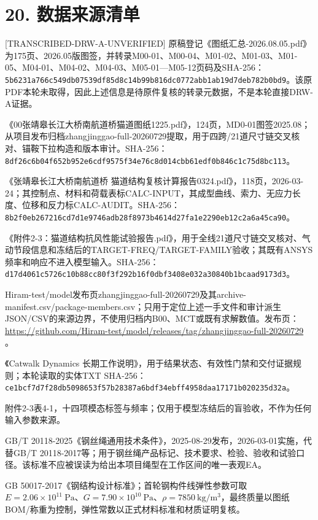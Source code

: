 \documentclass[UTF8,a4paper,11pt,fontset=none]{ctexart}
\begin{document}
\section*{20. 数据来源清单}
[TRANSCRIBED-DRW-A-UNVERIFIED] 原稿登记《图纸汇总-2026.08.05.pdf》为175页、2026.05版图签，并转录M00-01、M00-04、M01-02、M01-03、M01-05、M04-01、M04-02、M04-03、M05-01—M05-12页码及SHA-256：\nolinkurl{5b6231a766c549db07539df85d8c14b99b816dc0772abb1ab19d7deb782b0bd9}。该原PDF本轮未取得，因此上述信息是待原件复核的转录元数据，不是本轮直接DRW-A证据。\par
[DRW-2025-ARCHIVE] 《00张靖皋长江大桥南航道桥猫道图纸1225.pdf》，124页，MD0-01图签2025.08；从项目发布归档zhangjinggao-full-20260729提取，用于四跨/21道尺寸链交叉核对、锚鞍下拉构造和版本审计。SHA-256：\nolinkurl{8df26c6b04f652b952e6cdf9575f34e76c8d014cbb61edf0b846c1c75d8bc113}。\par
[CALC-REPORT] 《张靖皋长江大桥南航道桥 猫道结构复核计算报告0324.pdf》，118页，2026-03-24；其控制点、材料和荷载表标CALC-INPUT，其成型曲线、索力、无应力长度、位移和反力标CALC-AUDIT。SHA-256：\nolinkurl{8b2f0eb267216cd7d1e9746adb28f8973b4614d27fa1e2290eb12c2a6a45ca90}。\par
[WIND-REPORT] 《附件2-3：猫道结构抗风性能试验报告.pdf》，用于全线21道尺寸链交叉核对、气动节段信息和冻结后的TARGET-FREQ/TARGET-FAMILY验收；其既有ANSYS频率和响应不进入模型输入。SHA-256：\nolinkurl{d17d4061c5726c10b88cc80f3f292b16f0dbf3408e032a30840b1bcaad9173d3}。\par
[ARCHIVE-MANIFEST] Hiram-test/model发布页zhangjinggao-full-20260729及其archive-manifest.csv/package-members.csv；只用于定位上述一手文件和审计派生JSON/CSV的来源边界，不使用归档内B00、MCT或既有求解数值。发布页：\url{https://github.com/Hiram-test/model/releases/tag/zhangjinggao-full-20260729} 。\par
[PROJECT-CONTRACT] 《Catwalk Dynamics 长期工作说明》，用于结果状态、有效性门禁和交付证据规则；本轮读取的实体TXT SHA-256：\nolinkurl{ce1bcf7d7f28db5098653f57b28387a6bdf34ebff4958daa17171b020235d32a}。\par
[TARGET] 附件2-3表4-1，十四项模态标签与频率；仅用于模型冻结后的盲验收，不作为任何输入参数来源。\par
[STD-ROPE] GB/T 20118-2025《钢丝绳通用技术条件》，2025-08-29发布，2026-03-01实施，代替GB/T 20118-2017等；用于钢丝绳产品标记、技术要求、检验、验收和试验口径。该标准不应被误读为给出本项目绳型在工作区间的唯一表观EA。\par
[STD-STEEL] GB 50017-2017《钢结构设计标准》；首轮钢构件线弹性参数可取\(E=2.06\times10^{11}\ \mathrm{Pa}\)\allowbreak{}、\(G=7.90\times10^{10}\ \mathrm{Pa}\)\allowbreak{}、\(\rho=7850\ \mathrm{kg/m^3}\)\allowbreak{}，最终质量以图纸BOM/称重为控制，弹性常数以正式材料标准和材质证明复核。\par
\end{document}
